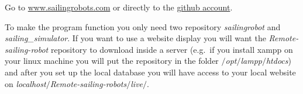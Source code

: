\documentclass[twoside,12pt]{report} %
\begin{document}
Go to \href{www.sailingrobots.com}{www.sailingrobots.com} or directly to the  \href{https://github.com/AlandSailingRobots}{github account}. 

To make the program function you only need two repository \textit{sailingrobot} and \textit{sailing\_simulator}. If you want to use a website display you will want the \textit{Remote-sailing-robot} repository to download inside a server (e.g.\ if you install xampp on your linux machine you will put the repository in the folder \textit{$\slash$opt$\slash$lampp$\slash$htdocs}) and after you set up the local database you will have access to your local website on \textit{localhost$\slash$Remote-sailing-robots$\slash$live$\slash$}.

%


\nocite{*}


\end{document}
